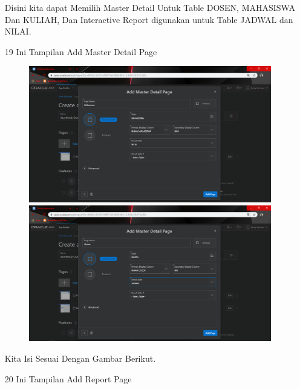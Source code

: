 \begin{enumerate}
\par
Disini kita dapat Memilih Master Detail Untuk Table DOSEN, MAHASISWA Dan KULIAH, Dan Interactive Report digunakan untuk Table JADWAL dan NILAI.

\newpage
\item[19]Ini Tampilan Add Master Detail Page

\begin{figure}[!htbp]
    \begin{center}
    \includegraphics[scale=0.3]{figures/27.png}
    \includegraphics[scale=0.3]{figures/28.png}
    \end{center}
    \end{figure}
    
\par
Kita Isi Sesuai Dengan Gambar Berikut.

\newpage
\item[20]Ini Tampilan Add Report Page


\end{enumerate}
